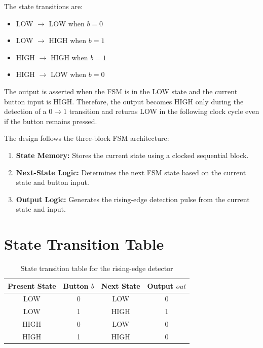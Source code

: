\documentclass[12pt,a4paper]{report}
\begin{document}
The state transitions are:

\begin{itemize}
    \item LOW $\rightarrow$ LOW when $b=0$
    \item LOW $\rightarrow$ HIGH when $b=1$
    \item HIGH $\rightarrow$ HIGH when $b=1$
    \item HIGH $\rightarrow$ LOW when $b=0$
\end{itemize}

The output is asserted when the FSM is in the LOW state and the current button input is HIGH. Therefore, the output becomes HIGH only during the detection of a $0\rightarrow1$ transition and returns LOW in the following clock cycle even if the button remains pressed.

The design follows the three-block FSM architecture:

\begin{enumerate}
    \item \textbf{State Memory:} Stores the current state using a clocked sequential block.
    \item \textbf{Next-State Logic:} Determines the next FSM state based on the current state and button input.
    \item \textbf{Output Logic:} Generates the rising-edge detection pulse from the current state and input.
\end{enumerate}

\section{State Transition Table}

\begin{table}[H]
    \centering
    \begin{tabular}{|c|c|c|c|}
        \hline
        \textbf{Present State} & \textbf{Button $b$} & \textbf{Next State} & \textbf{Output $out$} \\
        \hline
        LOW  & 0 & LOW  & 0 \\
        \hline
        LOW  & 1 & HIGH & 1 \\
        \hline
        HIGH & 0 & LOW  & 0 \\
        \hline
        HIGH & 1 & HIGH & 0 \\
        \hline
    \end{tabular}
    \caption{State transition table for the rising-edge detector}
    \label{tab:rising_edge_fsm}
\end{table}
\end{document}
